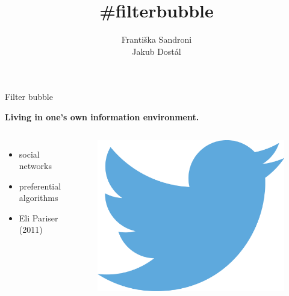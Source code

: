 \documentclass[notheorems,12pt]{beamer}
\title[]{\#filterbubble}
\date{}
\author{Františka Sandroni\\
        Jakub Dostál}
\institute{}
\begin{document}
\maketitle
\begin{frame}{Filter bubble}
    \center
    \vspace{-0.1cm}
    \begin{large}\textbf{Living in one's own information environment.}\end{large}
    \vspace{0.8cm}
    \begin{columns}
    \column{5cm}
    \begin{itemize}
        \item social networks
        \item preferential algorithms
        \item Eli Pariser (2011)
    \end{itemize}
    \column{6cm}
        \begin{figure}
            \centering
            \includegraphics[scale=0.4]{./Pics/twitter.png}
        \end{figure}
    \end{columns}
\end{frame}
\end{document}
